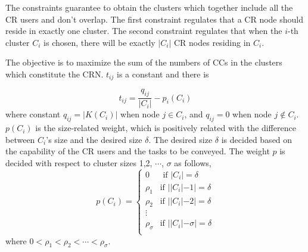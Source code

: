 \documentclass[times]{ettauth}
\theoremstyle{mytheoremstyle}
\theoremstyle{mytheoremstyle}
\theoremstyle{mytheoremstyle}
\begin{document}
The constraints guarantee to obtain the clusters which together include all the CR users and don't overlap.
The first constraint regulates that a CR node should reside in exactly one cluster.
The second constraint regulates that when the $i$-th cluster $C_i$ is chosen, there will be exactly $|C_i|$ CR nodes residing in $C_i$.

The objective is to maximize the sum of the numbers of CCs in the clusters which constitute the CRN.
$t_{ij}$ is a constant and there is
%
%

\begin{equation}
t_{ij} = \frac{q_{ij}}{|C_i|} - p_i(C_i)
\end{equation}
where constant $q_{ij}= |K(C_i)|$ when node $j\in C_i$, and $q_{ij}= 0$ when node $j\notin C_i$.
$p(C_i)$ is the size-related weight, which is positively related with the difference between $C_i$'s size and the desired size $\delta$.
The desired size $\delta$ is decided based on the capability of the CR users and the tasks to be conveyed.
The weight $p$ is decided with respect to cluster sizes 1,2, $\cdots$, $\sigma$ as follows,
$$
p(C_i) = \left\{ \begin{array}{rl}
0 &\mbox{ if $|C_i|=\delta$} \\
\rho_1 &\mbox{if $||C_i|-1|=\delta$} \\
\rho_2 &\mbox{if $||C_i|-2|=\delta$} \\
\vdots\\
\rho_\sigma &\mbox{if $||C_i|-\sigma|=\delta$} \\
\end{array} \right.
$$
where $ 0 < \rho_1< \rho_2 < \cdots < \rho_\sigma$.

\end{document}

